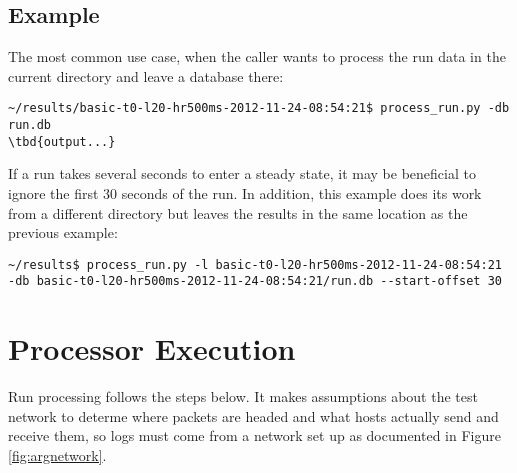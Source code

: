 \subsection{Example}
\par The most common use case, when the caller wants to process the run data in the current directory and leave a database there:
\begin{lstlisting}
~/results/basic-t0-l20-hr500ms-2012-11-24-08:54:21$ process_run.py -db run.db
\tbd{output...}
\end{lstlisting}

\par If a run takes several seconds to enter a steady state, it may be beneficial to ignore the first 30 seconds of the run. In addition, this example does its work from a different directory but leaves the results in the same location as the previous example:
\begin{lstlisting}
~/results$ process_run.py -l basic-t0-l20-hr500ms-2012-11-24-08:54:21 -db basic-t0-l20-hr500ms-2012-11-24-08:54:21/run.db --start-offset 30
\end{lstlisting}

\section{Processor Execution}
\par Run processing follows the steps below. It makes assumptions about the test network to determe where packets are headed and what hosts actually send and receive them, so logs must come from a network set up as documented in Figure \ref{fig:argnetwork}.

